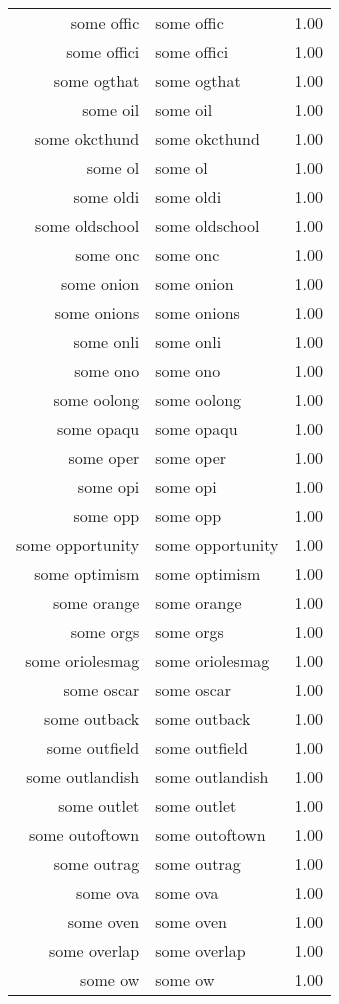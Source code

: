 \begin{table}[ht]
\begin{tabular}{rlr}
  some offic & some offic & 1.00 \\ 
  some offici & some offici & 1.00 \\ 
  some ogthat & some ogthat & 1.00 \\ 
  some oil & some oil & 1.00 \\ 
  some okcthund & some okcthund & 1.00 \\ 
  some ol & some ol & 1.00 \\ 
  some oldi & some oldi & 1.00 \\ 
  some oldschool & some oldschool & 1.00 \\ 
  some onc & some onc & 1.00 \\ 
  some onion & some onion & 1.00 \\ 
  some onions & some onions & 1.00 \\ 
  some onli & some onli & 1.00 \\ 
  some ono & some ono & 1.00 \\ 
  some oolong & some oolong & 1.00 \\ 
  some opaqu & some opaqu & 1.00 \\ 
  some oper & some oper & 1.00 \\ 
  some opi & some opi & 1.00 \\ 
  some opp & some opp & 1.00 \\ 
  some opportunity & some opportunity & 1.00 \\ 
  some optimism & some optimism & 1.00 \\ 
  some orange & some orange & 1.00 \\ 
  some orgs & some orgs & 1.00 \\ 
  some oriolesmag & some oriolesmag & 1.00 \\ 
  some oscar & some oscar & 1.00 \\ 
  some outback & some outback & 1.00 \\ 
  some outfield & some outfield & 1.00 \\ 
  some outlandish & some outlandish & 1.00 \\ 
  some outlet & some outlet & 1.00 \\ 
  some outoftown & some outoftown & 1.00 \\ 
  some outrag & some outrag & 1.00 \\ 
  some ova & some ova & 1.00 \\ 
  some oven & some oven & 1.00 \\ 
  some overlap & some overlap & 1.00 \\ 
  some ow & some ow & 1.00 \\ 

\end{tabular}
\end{table}
